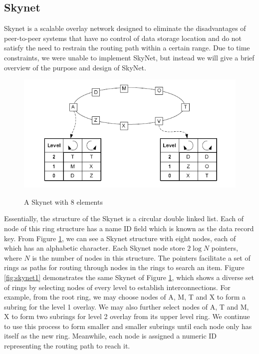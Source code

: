 \documentclass[oribibl]{llncs}
\begin{document}
\subsection{Skynet}

Skynet is a scalable overlay network designed to eliminate the disadvantages of peer-to-peer systems that have no control of data storage location and do not satisfy the need to restrain the routing path within a certain range. Due to time constraints, we were unable to implement SkyNet, but instead we will give a brief overview of the purpose and design of SkyNet.

\begin{figure}[here]
\center\underline{}
\includegraphics[width=12cm]{images/skynet}
\caption{A Skynet with 8 elements}
\label{fig:skynet}
\end{figure}

Essentially, the structure of the Skynet is a circular double linked list. Each of node of this ring structure has a name ID field which is known as the data record key. From Figure \ref{fig:skynet}, we can see a Skynet structure \cite{skip_net} with eight nodes, each of which has an alphabetic character. Each Skynet node store $2\log{N}$ pointers, where $N$ is the number of nodes in this structure. The pointers facilitate a set of rings as paths for routing through nodes in the rings to search an item. Figure \ref{fig:skynet1} demonstrates the same Skynet of Figure \ref{fig:skynet}, which shows a diverse set of rings by selecting nodes of every level to establish interconnections. For example, from the root ring, we may choose nodes of A, M, T and X to form a subring for the level 1 overlay. We may also further select nodes of A, T and M, X to form two subrings for level 2 overlay from its upper level ring. We continue to use this process to form smaller and smaller subrings until each node only has itself as the new ring. Meanwhile, each node is assigned a numeric ID representing the routing path to reach it.
\end{document}
